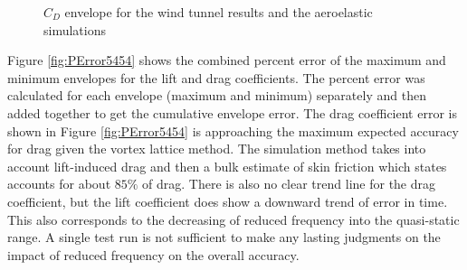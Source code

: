 \documentclass[11pt]{ucthesis}
\begin{document}
\begin{figure}[thpb]
\hfill
{}
\hfill
{}
\hfill
\caption{$C_D$ envelope for the wind tunnel results and the aeroelastic simulations}
\label{fig:CDEnvelope}
\end{figure}

Figure \ref{fig:PError5454} shows the combined percent error of the maximum and minimum envelopes for the lift and drag coefficients. The percent error was calculated for each envelope (maximum and minimum) separately and then added together to get the cumulative envelope error. The drag coefficient error is shown in Figure \ref{fig:PError5454} is approaching the maximum expected accuracy for drag given the vortex lattice method. The simulation method takes into account lift-induced drag and then a bulk estimate of skin friction which \cite{thomas1985aircraft} states accounts for about $85\%$ of drag. There is also no clear trend line for the drag coefficient, but the lift coefficient does show a downward trend of error in time. This also corresponds to the decreasing of reduced frequency into the quasi-static range. A single test run is not sufficient to make any lasting judgments on the impact of reduced frequency on the overall accuracy. 
\end{document}
